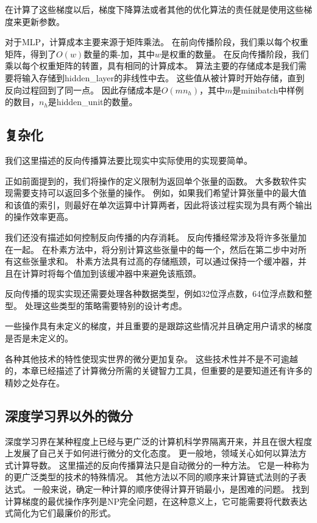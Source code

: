 在计算了这些梯度以后，梯度下降算法或者其他的优化算法的责任就是使用这些梯度来更新参数。

对于MLP，计算成本主要来源于矩阵乘法。
在前向传播阶段，我们乘以每个权重矩阵，得到了$O(w)$数量的乘-加，其中$w$是权重的数量。
在反向传播阶段，我们乘以每个权重矩阵的转置，具有相同的计算成本。
算法主要的存储成本是我们需要将输入存储到\gls{hidden_layer}的非线性中去。
这些值从被计算时开始存储，直到反向过程回到了同一点。
因此存储成本是$O(mn_h)$，其中$m$是minibatch中样例的数目，$n_h$是\gls{hidden_unit}的数量。
  
  
\subsection{复杂化}
\label{sec:complications}

我们这里描述的反向传播算法要比现实中实际使用的实现要简单。

正如前面提到的，我们将操作的定义限制为返回单个张量的函数。
大多数软件实现需要支持可以返回多个张量的操作。 
例如，如果我们希望计算张量中的最大值和该值的索引，则最好在单次运算中计算两者，因此将该过程实现为具有两个输出的操作效率更高。

我们还没有描述如何控制反向传播的内存消耗。
反向传播经常涉及将许多张量加在一起。
在朴素方法中，将分别计算这些张量中的每一个，然后在第二步中对所有这些张量求和。 
朴素方法具有过高的存储瓶颈，可以通过保持一个缓冲器，并且在计算时将每个值加到该缓冲器中来避免该瓶颈。

反向传播的现实实现还需要处理各种数据类型，例如32位浮点数，64位浮点数和整型。
处理这些类型的策略需要特别的设计考虑。

一些操作具有未定义的梯度，并且重要的是跟踪这些情况并且确定用户请求的梯度是否是未定义的。

各种其他技术的特性使现实世界的微分更加复杂。 这些技术性并不是不可逾越的，本章已经描述了计算微分所需的关键智力工具，但重要的是要知道还有许多的精妙之处存在。
  
  
\subsection{深度学习界以外的微分}
\label{sec:differentiation_outside_the_deep_learning_community}

深度学习界在某种程度上已经与更广泛的计算机科学界隔离开来，并且在很大程度上发展了自己关于如何进行微分的文化态度。
更一般地，领域关心如何以算法方式计算导数。 
这里描述的反向传播算法只是自动微分的一种方法。 
它是一种称为的更广泛类型的技术的特殊情况。 
其他方法以不同的顺序来计算链式法则的子表达式。 
一般来说，确定一种计算的顺序使得计算开销最小，是困难的问题。 
找到计算梯度的最优操作序列是NP完全问题\citep{naumann2008optimal}，在这种意义上，它可能需要将代数表达式简化为它们最廉价的形式。

